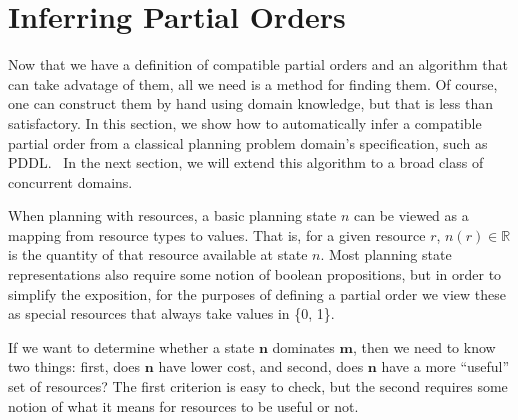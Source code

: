 \documentclass[letterpaper]{article}
\theoremstyle{plain} \newtheorem{theorem}{Theorem} \newtheorem{proposition}{Proposition} \newtheorem{lemma}{Lemma}
\theoremstyle{definition} \newtheorem{definition}{Definition} \newtheorem{conjecture}{Conjecture} \newtheorem*{example}{Example}
\theoremstyle{remark} \newtheorem*{remark}{Remark} \newtheorem*{note}{Note} \newtheorem{case}{Case}
\newcommand{\R}{\mathbb{R}}
\begin{document}
\section{Inferring Partial Orders}

\newcommand{\po}{\preceq_R}

Now that we have a definition of compatible partial orders and an
algorithm that can take advatage of them, all we need is a method
for finding them. Of course, one can construct them by hand using
domain knowledge, but that is less than satisfactory. In this
section, we show how to automatically infer a compatible partial
order from a classical planning problem domain's specification,
such as PDDL.~\citep{ghallab1998pddl,fox2003pddl2} In the next
section, we will extend this algorithm to a broad class of concurrent
domains.

When planning with resources, a basic planning state $n$ can be viewed as a mapping from
resource types to values. That is, for a given resource $r$, $n(r) \in \R$ is the quantity
of that resource available at state $n$. Most planning state representations also
require some notion of boolean propositions, but in order to simplify the exposition, for the
purposes of defining a partial order we view these as special resources that always take
values in \{0, 1\}.

If we want to determine whether a state $\mathbf{n}$ dominates $\mathbf{m}$, then we need
to know two things: first, does $\mathbf{n}$ have lower cost, and second, does $\mathbf{n}$
have a more ``useful'' set of resources? The first criterion is easy to check, but the
second requires some notion of what it means for resources to be useful or not.
\end{document}

